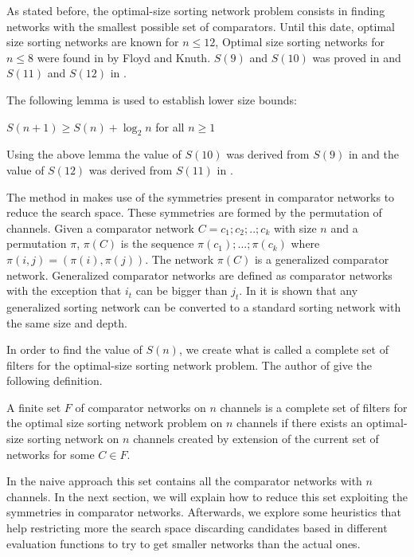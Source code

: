 \documentclass[../main.tex]{subfiles}
\begin{document}
	As stated before, the optimal-size sorting network problem consists in finding networks with the smallest possible set of comparators. Until this date, optimal size sorting networks are known for $n \leq 12$, Optimal size sorting networks for $n \leq 8$ were found in \cite{FLOYD1973163} by Floyd and Knuth. $S(9)$ and $S(10)$ was proved in \cite{sortingnineinputs} and $S(11)$ and $S(12)$ in \cite{harder2021answer}. 
	
	The following lemma \cite{VanVoorhis1972} is used to establish lower size bounds:
	
	\begin{lemma}
		$S(n+1) \geq S(n) + \log_2 n$ for all $n \geq 1$
	\end{lemma}

	Using the above lemma the value of $S(10)$ was derived from $S(9)$ in \cite{sortingnineinputs} and the value of $S(12)$ was derived from $S(11)$ in \cite{harder2021answer}.
	
	The method in \cite{sortingnineinputs} makes use of the symmetries present in comparator networks to reduce the search space. These symmetries are formed by the permutation of channels. Given a comparator network $C=c_1;c_2;..;c_k$ with size $n$ and a permutation $\pi$, $\pi(C)$ is the sequence $\pi(c_1);...;\pi(c_k)$ where $\pi(i,j)=(\pi(i),\pi(j))$. The network $\pi(C)$ is a generalized comparator network. Generalized comparator networks are defined as comparator networks with the exception that $i_t$ can be bigger than $j_t$. In \cite{knuth1997art} it is shown that any generalized sorting network can be converted to a standard sorting network with the same size and depth.
	
	In order to find the value of $S(n)$, we create what is called a complete set of filters for the optimal-size sorting network problem. The author of \cite{sortingnineinputs} give the following definition. 
	
	\begin{definition}
		A finite set $F$ of comparator networks on $n$ channels is a complete set of filters for the optimal size sorting network problem on $n$ channels if there exists an optimal-size sorting network on $n$ channels created by extension of the current set of networks for some $C \in F$.
	\end{definition}
	
	In the naive approach this set contains all the comparator networks with $n$ channels. In the next section, we will explain how to reduce this set exploiting the symmetries in comparator networks. Afterwards, we explore some heuristics that help restricting more the search space discarding candidates based in different evaluation functions to try to get smaller networks than the actual ones.
	\newpage
\end{document}
